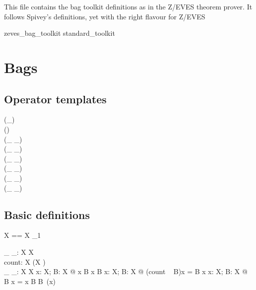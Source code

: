 \documentclass[draft,a4paper,10pt,wd]{article}
\begin{document}
This file contains the bag toolkit definitions as in the Z/EVES
theorem prover. It follows Spivey's definitions, yet with the
right flavour for Z/EVES

\begin{zsection}
\SECTION zeves\_bag\_toolkit \parents standard\_toolkit
\end{zsection}

\section{Bags }\label{def-bag}

\subsection*{Operator templates}

\begin{zed}
    \generic (\bag \_) \\
    \function (\lbag \listarg \rbag) \\
     \leftassoc (\_ \bcount \_) \\
     \leftassoc (\_ \otimes \_) \\
    \relation (\_ \inbag \_) \\
    \relation (\_ \subbageq \_) \\
     \leftassoc (\_ \uplus \_) \\
     \leftassoc (\_ \uminus \_)
\end{zed}

\subsection*{Basic definitions}

\begin{zed}
  \bag X == X \pfun \nat_1
\end{zed}

\begin{gendef}[X]
  \_ \inbag \_: X \rel \bag X \\
  count: \bag X \fun (X \fun \nat) \\
  \_ \bcount \_: \bag X \cross X \fun \nat
\where
  \forall x: X; B: \bag X @ x \inbag B \iff x \in \dom B
\also
  \forall x: X; B: \bag X @ (count ~ B)x = B \bcount x
\also
  \forall x: X; B: \bag X @ B \bcount x =
    \IF x \inbag B \THEN B~(x) 
\end{gendef}
\end{document}
